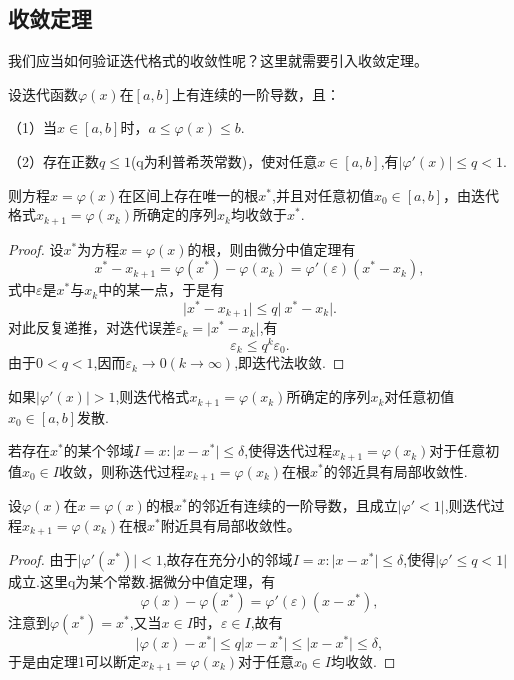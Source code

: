 \subsection{收敛定理}
我们应当如何验证迭代格式的收敛性呢？这里就需要引入收敛定理。
\begin{thm}\label{t2.1}
设迭代函数$\varphi(x)$在$[a,b]$上有连续的一阶导数，且：

（1）当$x\in[a,b]$时，$a \leq \varphi(x)\leq b $.

（2）存在正数$q\leq1$(q为利普希茨常数)，使对任意$x \in [a,b]$,有$\lvert \varphi'(x) \rvert \leq q<1 $.

则方程$x=\varphi(x)$在区间上存在唯一的根$x^*$,并且对任意初值$x_0\in [a,b]$，由迭代格式$x_{k+1}=\varphi(x_k)$所确定的序列${x_k}$均收敛于${x^*}$.
\end{thm}
\begin{proof}
设$x^*$为方程$x=\varphi(x)$的根，则由微分中值定理有
\begin{equation}
x^*-x_{k+1}=\varphi(x^*)-\varphi(x_k)={\varphi'}(\varepsilon)(x^*-x_k),
\end{equation}
式中$\varepsilon$是$x^*$与$x_k$中的某一点，于是有
\begin{equation}
\lvert x^*-x_{k+1}\rvert\leq q\lvert\ x^* - x_k \rvert.
\end{equation}
对此反复递推，对迭代误差$\varepsilon_k=\lvert x^* - x_k \rvert$,有
\begin{equation}
\varepsilon_k \leq q^k\varepsilon_0.
\end{equation}
由于$0<q<1$,因而$\varepsilon_k\rightarrow0(k\rightarrow\infty)$,即迭代法收敛.
\end{proof}
\begin{cor}\label{c2.1}
如果$\lvert{\varphi'}(x)\rvert>1$,则迭代格式$x_{k+1}=\varphi(x_k)$所确定的序列${x_k}$对任意初值$x_0\in [a,b]$发散.
\end{cor}
若存在$x^*$的某个邻域$I={x:\lvert x-x^* \rvert\leq\delta}$,使得迭代过程$x_{k+1}=\varphi(x_k)$对于任意初值$x_0\in I$收敛，则称迭代过程$x_{k+1}=\varphi(x_k)$在根$x^*$的邻近具有局部收敛性.
\begin{thm}\label{t2.2}
设$\varphi(x)$在$x=\varphi(x)$的根$x^*$的邻近有连续的一阶导数，且成立$\lvert {\varphi'}<1 \rvert$,则迭代过程$x_{k+1}=\varphi(x_k)$在根$x^*$附近具有局部收敛性。
\end{thm}
\begin{proof}
由于$\lvert {\varphi'}(x^*) \rvert < 1$,故存在充分小的邻域$I={x:\lvert x-x^* \rvert\leq\delta}$,使得$\lvert {\varphi'} \leq q <1\rvert$成立.这里q为某个常数.据微分中值定理，有
\begin{equation}
\varphi(x)-\varphi(x^*)={\varphi'}(\varepsilon)(x-x^*),
\end{equation}
注意到$\varphi(x^*)=x^*$,又当$x\in I$时，$\varepsilon \in I$,故有
\begin{equation}
\lvert \varphi(x) - x^* \rvert\leq q\lvert x-x^* \rvert\leq\lvert x-x^* \rvert\leq\delta,
\end{equation}
于是由定理1可以断定$x_{k+1}=\varphi(x_k)$对于任意$x_0 \in I$均收敛.
\end{proof}
